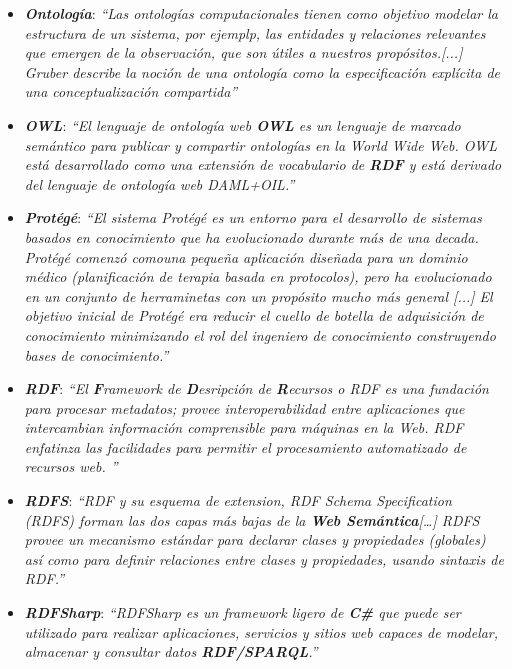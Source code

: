 \begin{itemize}
    \item \textbf{\textit{Ontología}}: \textit{“Las ontologías computacionales tienen como objetivo 
    modelar la estructura de un sistema, por ejemplp, las entidades y relaciones relevantes que emergen 
    de la observación, que son útiles a nuestros propósitos.[...] Gruber \autocite*{Gruber1995} describe la noción de una ontología 
    como la especificación explícita de una conceptualización compartida”} \autocite*{Guarino2009}

    \item \textbf{\textit{OWL}}: \textit{“El lenguaje de ontología web \textbf{OWL} es un lenguaje de marcado semántico para publicar
    y compartir ontologías en la World Wide Web. OWL está desarrollado como una extensión de vocabulario de \textbf{RDF} y está 
    derivado del lenguaje de ontología web DAML+OIL.”} \autocite*{Bechhofer2004}

    \item \textbf{\textit{Protégé}}: \textit{“El sistema Protégé es un entorno para el desarrollo de sistemas basados en 
    conocimiento que ha evolucionado durante más de una decada. Protégé comenzó comouna pequeña aplicación diseñada para un 
    dominio médico (planificación de terapia basada en protocolos), pero ha evolucionado en un conjunto de herraminetas con un 
    propósito mucho más general [...] El objetivo inicial de Protégé era reducir el cuello de botella de adquisición de conocimiento
    minimizando el rol del ingeniero de conocimiento construyendo bases de conocimiento.”} \autocite*{Gennari2003}

    \item \textbf{\textit{RDF}}: \textit{“El \textbf{F}ramework de \textbf{D}esripción de \textbf{R}ecursos o RDF es una fundación para 
    procesar metadatos; provee interoperabilidad entre aplicaciones que intercambian información comprensible para máquinas en la Web.
    RDF enfatinza las facilidades para permitir el procesamiento automatizado de recursos web. ”} \autocite*{Lassila1999}

    \item \textbf{\textit{RDFS}}: \textit{“RDF y su esquema de extension, RDF Schema Specification (RDFS) forman las dos capas más 
    bajas de la \textbf{Web Semántica}[\dots] RDFS provee un mecanismo estándar para declarar clases y propiedades (globales) así como 
    para definir relaciones entre clases y propiedades, usando sintaxis de RDF.”} \autocite*{Kaoudi2008}

    \item \textbf{\textit{RDFSharp}}: \textit{“RDFSharp es un framework ligero de \textbf{C\#} que puede ser utilizado para 
    realizar aplicaciones, servicios y sitios web capaces de modelar, almacenar y consultar datos \textbf{RDF/SPARQL}.”} 
    \autocite*{DeSalvo41}


\end{itemize}
